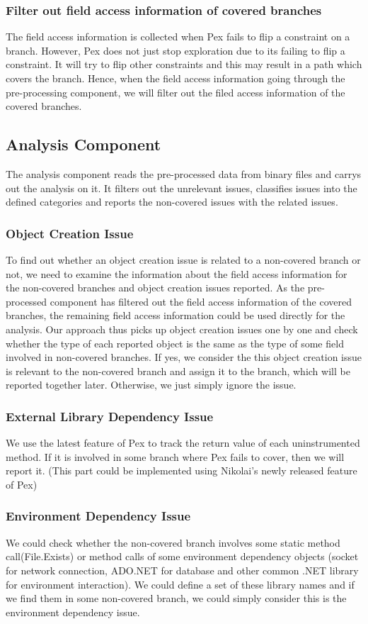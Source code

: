 \subsubsection{Filter out field access information of covered branches}
The field access information is collected when Pex fails to flip a constraint on a branch. However, Pex does not just stop exploration due to its failing to flip a constraint. It will try to flip other constraints and this may result in a path which covers the branch. Hence, when the field access information going through the pre-processing component, we will filter out the filed access information of the covered branches.
\subsection{Analysis Component}
The analysis component reads the pre-processed data from binary files and carrys out the analysis on it. It filters out the unrelevant issues, classifies issues into the defined categories and reports the non-covered issues with the related issues. 
\subsubsection{Object Creation Issue}
To find out whether an object creation issue is related to a non-covered branch or not, we need to examine the information about the field access information for the non-covered branches and object creation issues reported. As the pre-processed component has filtered out the field access information of the covered branches, the remaining field access information could be used directly for the analysis. Our approach thus picks up object creation issues one by one and check whether the type of each reported object is the same as the type of some field involved in non-covered branches. If yes, we consider the this object creation issue is relevant to the non-covered branch and assign it to the branch, which will be reported together later. Otherwise, we just simply ignore the issue.
\subsubsection{External Library Dependency Issue}
We use the latest feature of Pex to track the return value of each uninstrumented method. If it is involved in some branch where Pex fails to cover, then we will report it. (This part could be implemented using Nikolai's newly released feature of Pex)
\subsubsection{Environment Dependency Issue}
We could check whether the non-covered branch involves some static method call(File.Exists) or method calls of some environment dependency objects (socket for network connection, ADO.NET for database and other common .NET library for environment interaction). We could define a set of these library names and if we find them in some non-covered branch, we could simply consider this is the environment dependency issue.
